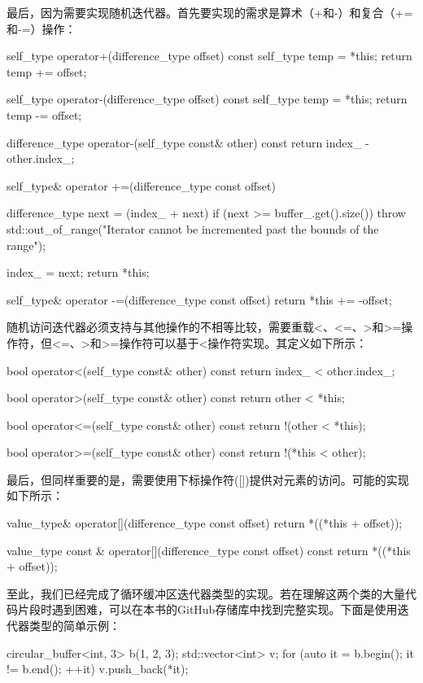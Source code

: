 最后，因为需要实现随机迭代器。首先要实现的需求是算术（+和-）和复合（+=和-=）操作：

\begin{cpp}
self_type operator+(difference_type offset) const
{
	self_type temp = *this;
	return temp += offset;
}

self_type operator-(difference_type offset) const
{
	self_type temp = *this;
	return temp -= offset;
}

difference_type operator-(self_type const& other) const
{
	return index_ - other.index_;
}

self_type& operator +=(difference_type const offset)
{
	difference_type next =
		(index_ + next) %
	if (next >= buffer_.get().size())
		throw std::out_of_range("Iterator cannot be
								 incremented past the bounds of the range");
								 
	index_ = next;
	return *this;
}

self_type& operator -=(difference_type const offset)
{
	return *this += -offset;
}
\end{cpp}

随机访问迭代器必须支持与其他操作的不相等比较，需要重载<、<=、>和>=操作符，但<=、>和>=操作符可以基于<操作符实现。其定义如下所示：

\begin{cpp}
bool operator<(self_type const& other) const
{
	return index_ < other.index_;
}

bool operator>(self_type const& other) const
{
	return other < *this;
}

bool operator<=(self_type const& other) const
{
	return !(other < *this);
}

bool operator>=(self_type const& other) const
{
	return !(*this < other);
}
\end{cpp}

最后，但同样重要的是，需要使用下标操作符([])提供对元素的访问。可能的实现如下所示：

\begin{cpp}
value_type& operator[](difference_type const offset)
{
	return *((*this + offset));
}

value_type const & operator[](difference_type const offset)
const
{
	return *((*this + offset));
}
\end{cpp}

至此，我们已经完成了循环缓冲区迭代器类型的实现。若在理解这两个类的大量代码片段时遇到困难，可以在本书的GitHub存储库中找到完整实现。下面是使用迭代器类型的简单示例：

\begin{cpp}
circular_buffer<int, 3> b({1, 2, 3});
std::vector<int> v;
for (auto it = b.begin(); it != b.end(); ++it)
{
	v.push_back(*it);
}
\end{cpp}

